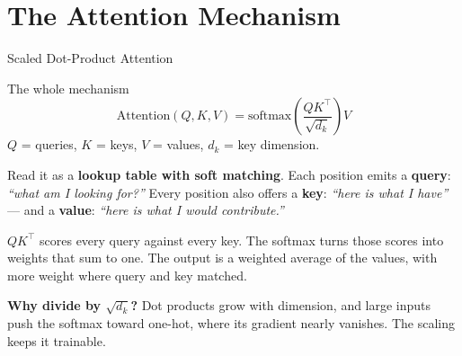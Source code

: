 \documentclass[aspectratio=169, 11pt]{beamer}
\begin{document}
\section{The Attention Mechanism}


\begin{frame}{Scaled Dot-Product Attention \parencite{Vaswani2017}}
  \begin{definitionbox}{The whole mechanism}
    \[
      \text{Attention}(Q, K, V) = \text{softmax}\!\left(\frac{QK^\top}{\sqrt{d_k}}\right) V
    \]
    $Q$ = queries, $K$ = keys, $V$ = values, $d_k$ = key dimension.
  \end{definitionbox}

  Read it as a \textbf{lookup table with soft matching}. Each position emits a \textbf{query}:
  \emph{``what am I looking for?''} Every position also offers a \textbf{key}: \emph{``here is
  what I have''} --- and a \textbf{value}: \emph{``here is what I would contribute.''}

  \vspace{0.15cm}
  $QK^\top$ scores every query against every key. The softmax turns those scores into weights
  that sum to one. The output is a weighted average of the values, with more weight where query
  and key matched.

  \textbf{Why divide by $\sqrt{d_k}$?} Dot products grow with dimension, and large inputs push
  the softmax toward one-hot, where its gradient nearly vanishes. The scaling keeps it trainable.
\end{frame}
\end{document}
